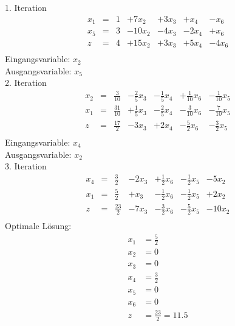 \documentclass[a4paper]{scrartcl}
\begin{document}
\begin{enumerate}
        1. Iteration
        \begin{equation}
            \begin{array}{rcrrrrr}
                x_1 & = & 1 & +7x_2 & +3x_3 & +x_4 & -x_6 \\
                x_5 & = & 3 & -10x_2 & -4x_3 & -2x_4 & +x_6 \\
                \hline
                z   & = & 4 & +15x_2 & +3x_3 & +5x_4 & -4x_6 \\
            \end{array}
        \end{equation}
        Eingangsvariable: $x_2$ \\
        Ausgangsvariable: $x_5$ \\

        2. Iteration
        \begin{equation}
            \begin{array}{rcrrrrr}
                x_2 & = & \frac{3}{10} & -\frac{2}{5}x_3 & -\frac{1}{5}x_4 & +\frac{1}{10}x_6 & -\frac{1}{10}x_5 \\
                x_1 & = & \frac{31}{10} & +\frac{1}{5}x_3 & -\frac{2}{5}x_4 & -\frac{3}{10}x_6 & -\frac{7}{10}x_5 \\
                \hline
                z   & = & \frac{17}{2} & -3x_3 & +2x_4 & -\frac{5}{2}x_6 & -\frac{3}{2}x_5 \\
            \end{array}
        \end{equation}
        Eingangsvariable: $x_4$ \\
        Ausgangsvariable: $x_2$ \\

        3. Iteration
        \begin{equation}
            \begin{array}{rcrrrrr}
                x_4 & = & \frac{3}{2} & -2x_3 & +\frac{1}{2}x_6 & -\frac{1}{2}x_5 & -5x_2 \\
                x_1 & = & \frac{5}{2} & +x_3 & -\frac{1}{2}x_6 & -\frac{1}{2}x_5 & +2x_2 \\
                \hline
                z   & = & \frac{23}{2} & -7x_3 & -\frac{3}{2}x_6 & -\frac{5}{2}x_5 & -10x_2 \\
            \end{array}
        \end{equation}
        Optimale Lösung:
        \begin{equation}
            \begin{split}
                x_1 &= \frac{5}{2} \\
                x_2 &= 0 \\
                x_3 &= 0 \\
                x_4 &= \frac{3}{2} \\
                x_5 &= 0 \\
                x_6 &= 0 \\
                z   &= \frac{23}{2} = \num{11,5}
            \end{split}
        \end{equation}


\end{enumerate}
\end{document}
